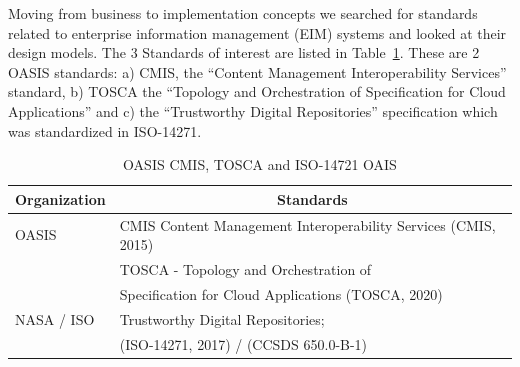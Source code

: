 \documentclass[runningheads]{llncs}
\begin{document}
Moving from business to implementation concepts we searched for standards related to enterprise information management (EIM) systems and looked at their design models. The 3 Standards of interest are listed in Table~\ref{tab4}. These are 2 OASIS standards: a) CMIS, the “Content Management Interoperability Services” standard, b) TOSCA the “Topology and Orchestration of Specification for Cloud Applications” and c) the “Trustworthy Digital Repositories” specification which was standardized in ISO-14271.

\begin{table}
\caption{OASIS CMIS, TOSCA and ISO-14721 OAIS }\label{tab4}
\begin{tabular}{|l|l|}
\multicolumn{1}{c}{\textbf{Organization}} & \multicolumn{1}{c}{\textbf{Standards}}\\ \hline
OASIS & CMIS Content Management Interoperability Services (CMIS, 2015) \\
      & TOSCA - Topology and Orchestration of \\
      & Specification for Cloud Applications (TOSCA, 2020)\\ \hline
NASA / ISO & Trustworthy Digital Repositories; \\ 
        & (ISO-14271, 2017) / (CCSDS 650.0-B-1)\\ \hline
\end{tabular}
\end{table}  
\,  %
\end{document}

